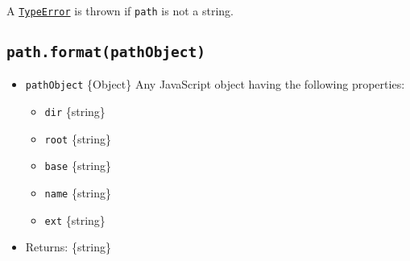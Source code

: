 \begin{Shaded}
\begin{Highlighting}[]
\NormalTok{(}\NormalTok{)}\OperatorTok{;}

\NormalTok{(}\NormalTok{)}\OperatorTok{;}

\NormalTok{(}\NormalTok{)}\OperatorTok{;}

\NormalTok{(}\NormalTok{)}\OperatorTok{;}

\NormalTok{(}\NormalTok{)}\OperatorTok{;}

\NormalTok{(}\NormalTok{)}\OperatorTok{;}
\end{Highlighting}
\end{Shaded}

A \href{errors.md\#class-typeerror}{\texttt{TypeError}} is thrown if
\texttt{path} is not a string.

\subsection{\texorpdfstring{\texttt{path.format(pathObject)}}{path.format(pathObject)}}\label{path.formatpathobject}

\begin{itemize}
\tightlist
\item
  \texttt{pathObject} \{Object\} Any JavaScript object having the
  following properties:

  \begin{itemize}
  \tightlist
  \item
    \texttt{dir} \{string\}
  \item
    \texttt{root} \{string\}
  \item
    \texttt{base} \{string\}
  \item
    \texttt{name} \{string\}
  \item
    \texttt{ext} \{string\}
  \end{itemize}
\item
  Returns: \{string\}
\end{itemize}

